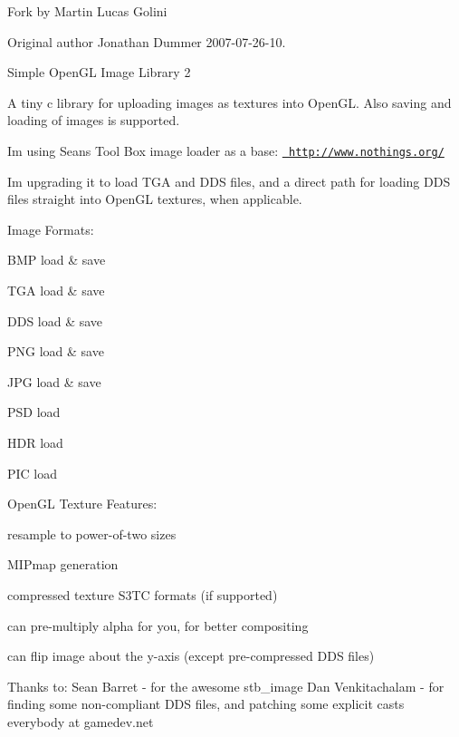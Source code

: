 Fork by Martin Lucas Golini

Original author Jonathan Dummer 2007-\/07-\/26-\/10.

Simple Open\+GL Image Library 2

A tiny c library for uploading images as textures into Open\+GL. Also saving and loading of images is supported.

I\textquotesingle{}m using Sean\textquotesingle{}s Tool Box image loader as a base\+: \href{http://www.nothings.org/}{\texttt{ http\+://www.\+nothings.\+org/}}

I\textquotesingle{}m upgrading it to load T\+GA and D\+DS files, and a direct path for loading D\+DS files straight into Open\+GL textures, when applicable.

Image Formats\+:
\begin{DoxyItemize}
\item B\+MP load \& save
\item T\+GA load \& save
\item D\+DS load \& save
\item P\+NG load \& save
\item J\+PG load \& save
\item P\+SD load
\item H\+DR load
\item P\+IC load
\end{DoxyItemize}

Open\+GL Texture Features\+:
\begin{DoxyItemize}
\item resample to power-\/of-\/two sizes
\item M\+I\+Pmap generation
\item compressed texture S3\+TC formats (if supported)
\item can pre-\/multiply alpha for you, for better compositing
\item can flip image about the y-\/axis (except pre-\/compressed D\+DS files)
\end{DoxyItemize}

Thanks to\+: Sean Barret -\/ for the awesome stb\+\_\+image Dan Venkitachalam -\/ for finding some non-\/compliant D\+DS files, and patching some explicit casts everybody at gamedev.\+net 